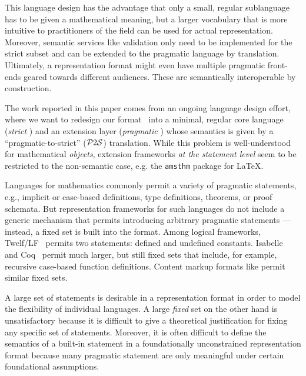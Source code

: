 This language design has the advantage that only a small, regular sublanguage has to be
given a mathematical meaning, but a larger vocabulary that is more intuitive to
practitioners of the field can be used for actual representation. Moreover, semantic
services like validation only need to be implemented for the strict subset and can be
extended to the pragmatic language by translation. Ultimately, a representation format
might even have multiple pragmatic front-ends geared towards different audiences. These
are semantically interoperable by construction.
\medskip

The work reported in this paper comes from an ongoing language design effort, where we
want to redesign our \omdoc format~\cite{Kohlhase:OMDoc1.2} into a minimal, regular core
language (\emph{strict }) and an extension layer (\emph{pragmatic }) whose
semantics is given by a ``pragmatic-to-strict'' ($\mathcal{P}2\mathcal{S}$) translation.  While this problem
is well-understood for mathematical \emph{objects}, extension frameworks \emph{at the
  statement level} seem to be restricted to the non-semantic case, e.g. the
\texttt{amsthm} package for {\LaTeX}.

Languages for mathematics commonly permit a variety of pragmatic statements, e.g.,
implicit or case-based definitions, type definitions, theorems, or proof schemata.  But
representation frameworks for such languages do not include a generic mechanism that
permits introducing arbitrary pragmatic statements --- instead, a fixed set is built into
the format.  Among logical frameworks, Twelf/LF~\cite{twelf,lf} permits two statements:
defined and undefined constants. Isabelle~\cite{isabelle} and Coq~\cite{coq} permit much
larger, but still fixed sets that include, for example, recursive case-based function
definitions.  Content markup formats like \omdoc permit similar fixed sets.

A large set of statements is desirable in a representation format in order to model the
flexibility of individual languages. A large \emph{fixed} set on the other hand is
unsatisfactory because it is difficult to give a theoretical justification for fixing any
specific set of statements.  Moreover, it is often difficult to define the semantics of a
built-in statement in a foundationally unconstrained representation format because many
pragmatic statement are only meaningful under certain foundational assumptions.
\medskip

